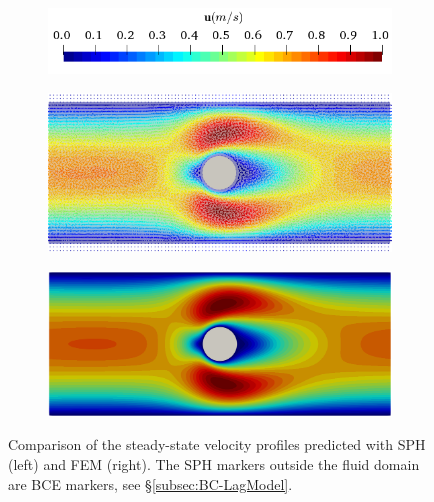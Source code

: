 \documentclass[final,3p,times]{elsarticle}
\begin{document}
\begin{figure}[H]
	\centering	
	\begin{subfigure}{0.45\columnwidth}	
		\centering
		\includegraphics[width=1.0\textwidth]{Images/FOC_U.png}
	\end{subfigure}
	
	\begin{subfigure}{0.47\columnwidth}	
		\centering
		\includegraphics[width=1.0\textwidth]{Images/FOC_SPH_U.png}
	\end{subfigure}
	\begin{subfigure}{0.47\columnwidth}
		\centering
		\includegraphics[width=1.0\textwidth]{Images/FOC_FEM_U.png}
	\end{subfigure}
	\caption{Comparison of the steady-state velocity profiles predicted with SPH (left) and FEM (right). The SPH markers outside the fluid domain are BCE markers, see \S\ref{subsec:BC-LagModel}.}	\label{fig:FoCV}
\end{figure} 
\end{document}

